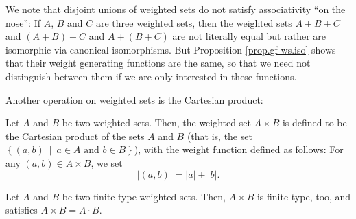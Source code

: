 We note that disjoint unions of weighted sets do not satisfy associativity
\textquotedblleft on the nose\textquotedblright: If $A$, $B$ and $C$ are three
weighted sets, then the weighted sets $A+B+C$ and $\left(  A+B\right)  +C$ and
$A+\left(  B+C\right)  $ are not literally equal but rather are isomorphic via
canonical isomorphisms. But Proposition \ref{prop.gf-ws.iso} shows that their
weight generating functions are the same, so that we need not distinguish
between them if we are only interested in these functions. \medskip

Another operation on weighted sets is the Cartesian product:

\begin{definition}
\label{def.gf-ws.prod}Let $A$ and $B$ be two weighted sets. Then, the weighted
set $A\times B$ is defined to be the Cartesian product of the sets $A$ and $B$
(that is, the set $\left\{  \left(  a,b\right)  \ \mid\ a\in A\text{ and }b\in
B\right\}  $), with the weight function defined as follows: For any $\left(
a,b\right)  \in A\times B$, we set%
\begin{equation}
\left\vert \left(  a,b\right)  \right\vert =\left\vert a\right\vert
+\left\vert b\right\vert . \label{eq.def.gf-ws.prod.wt}%
\end{equation}

\end{definition}

\begin{proposition}
\label{prop.gf-ws.prod}Let $A$ and $B$ be two finite-type weighted sets. Then,
$A\times B$ is finite-type, too, and satisfies $\overline{A\times B}%
=\overline{A}\cdot\overline{B}$.
\end{proposition}


